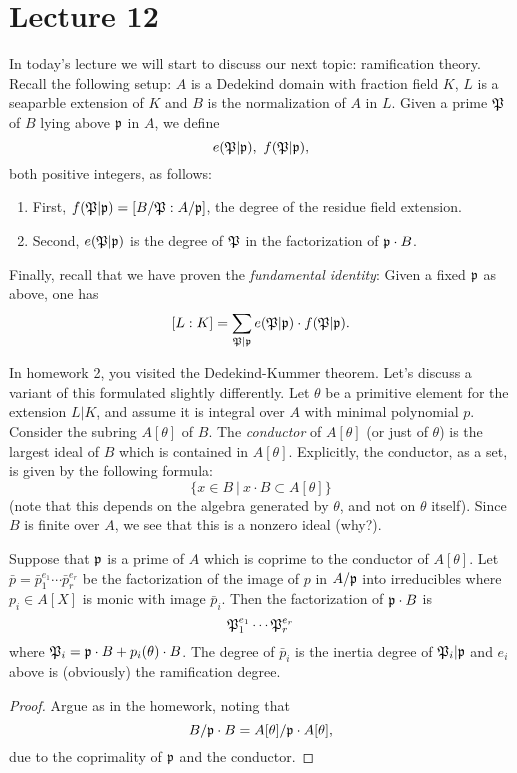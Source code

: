 \section{Lecture 12}

In today's lecture we will start to discuss our next topic: ramification theory.
Recall the following setup: $A$ is a Dedekind domain with fraction field $K$, $L$ is a seaparble extension of $K$ and $B$ is the normalization of $A$ in $L$.
Given a prime $\mathfrak{P}$ of $B$ lying above $\mathfrak{p}$ in $A$, we define
\[ e(\Pfrak|\pfrak), \ f(\Pfrak|\pfrak), \]
both positive integers, as follows:
\begin{enumerate}
  \item First, $f(\mathfrak{P}|\mathfrak{p}) = [B/\mathfrak{P} : A/\mathfrak{p}]$, the degree of the residue field extension.
  \item Second, $e(\mathfrak{P}|\mathfrak{p})$ is the degree of $\mathfrak{P}$ in the factorization of $\mathfrak{p} \cdot B$.
\end{enumerate}
Finally, recall that we have proven the \emph{fundamental identity}: Given a fixed $\mathfrak{p}$ as above, one has
\[ [L:K] = \sum_{\mathfrak{P}|\mathfrak{p}} e(\mathfrak{P}|\mathfrak{p}) \cdot f(\mathfrak{P}|\mathfrak{p}). \]

In homework 2, you visited the Dedekind-Kummer theorem.
Let's discuss a variant of this formulated slightly differently.
Let $\theta$ be a primitive element for the extension $L|K$, and assume it is integral over $A$ with minimal polynomial $p$.
Consider the subring $A[\theta]$ of $B$.
The \emph{conductor} of $A[\theta]$ (or just of $\theta$) is the largest ideal of $B$ which is contained in $A[\theta]$.
Explicitly, the conductor, as a set, is given by the following formula:
\[ \{ x \in B \ | \ x \cdot B \subset A[\theta] \} \]
(note that this depends on the algebra generated by $\theta$, and not on $\theta$ itself).
Since $B$ is finite over $A$, we see that this is a nonzero ideal (why?).

\begin{proposition}\label{proposition:prime_split}
  Suppose that $\mathfrak{p}$ is a prime of $A$ which is coprime to the conductor of $A[\theta]$.
  Let $\bar p = \bar p_{1}^{e_{1}} \cdots \bar p_{r}^{e_{r}}$ be the factorization of the image of $p$ in $A/\mathfrak{p}$ into irreducibles where $p_{i} \in A[X]$ is monic with image $\bar p_{i}$.
  Then the factorization of $\mathfrak{p} \cdot B$ is
  \[ \mathfrak{P}_{1}^{e_{1}} \cdots \mathfrak{P}_{r}^{e_{r}} \]
  where $\mathfrak{P}_{i} = \mathfrak{p} \cdot B + p_{i}(\theta) \cdot B$.
  The degree of $\bar p_{i}$ is the inertia degree of $\mathfrak{P}_{i}|\mathfrak{p}$ and $e_{i}$ above is (obviously) the ramification degree.
\end{proposition}
\begin{proof}
  Argue as in the homework, noting that
  \[ B/\mathfrak{p} \cdot B = A[\theta]/\mathfrak{p} \cdot A[\theta], \]
  due to the coprimality of $\mathfrak{p}$ and the conductor.
\end{proof}

